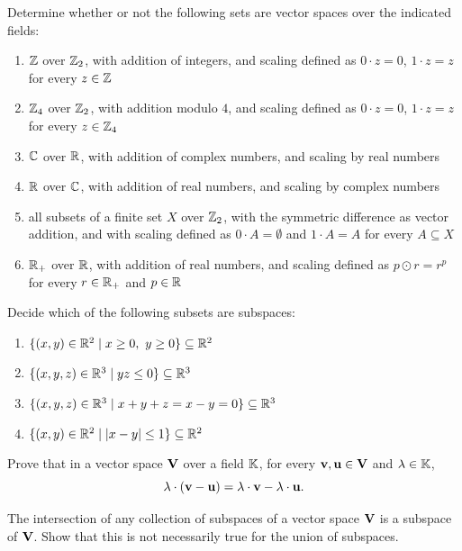 \begin{exercise}
Determine whether or not the following sets are vector spaces over the indicated fields:
\begin{enumerate}[label=(\alph*)]
\item $\mathbb{Z}$ over $\mathbb{Z}_2$, with addition of integers, and scaling defined as $0\cdot z = 0$, $1\cdot z = z$
for every $z\in\mathbb{Z}$
\item $\mathbb{Z}_4$ over $\mathbb{Z}_2$, with addition modulo $4$, and scaling defined as $0\cdot z = 0$,
$1\cdot z = z$ for every $z\in\mathbb{Z}_4$
\item $\mathbb{C}$ over $\mathbb{R}$, with addition of complex numbers, and scaling by real numbers
\item $\mathbb{R}$ over $\mathbb{C}$, with addition of real numbers, and scaling by complex numbers
\item all subsets of a finite set $X$ over $\mathbb{Z}_2$, with the symmetric difference as vector addition, and
with scaling defined as $0\cdot A = \emptyset$ and $1\cdot A = A$ for every $A\subseteq X$
\item $\mathbb{R}_+$ over $\mathbb{R}$, with addition of real numbers, and scaling defined as $p\odot r = r^p$ for every
$r\in\mathbb{R}_+$ and $p\in\mathbb{R}$
\end{enumerate}
\end{exercise}

\begin{exercise}
Decide which of the following subsets are subspaces:
\begin{enumerate}[label=(\alph*)]
\item $\{(x,y)\in\mathbb{R}^2 \mid x\geq 0,\ y\geq 0\}\subseteq \mathbb{R}^2$
\item $\{(x,y,z)\in\mathbb{R}^3 \mid yz \leq 0\}\subseteq \mathbb{R}^3$
\item $\{(x,y,z)\in\mathbb{R}^3 \mid x+y+z = x-y = 0\}\subseteq \mathbb{R}^3$
\item $\{(x,y)\in\mathbb{R}^2 \mid |x-y|\leq 1\}\subseteq \mathbb{R}^2$
\end{enumerate}
\end{exercise}

\begin{exercise}
Prove that in a vector space $\mathbf{V}$ over a field $\mathbb{K}$, for every $\mathbf{v},\mathbf{u}\in \mathbf{V}$ and $\lambda\in\mathbb{K}$,
\[
\lambda\cdot(\mathbf{v}-\mathbf{u}) = \lambda\cdot\mathbf{v} - \lambda\cdot\mathbf{u}.
\]
\end{exercise}

\begin{exercise}
The intersection of any collection of subspaces of a vector space $\mathbf{V}$ is a subspace of $\mathbf{V}$. Show that
this is not necessarily true for the union of subspaces.
\end{exercise}

